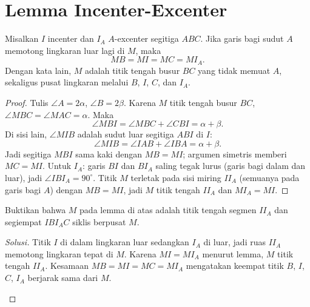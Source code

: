 \documentclass[12pt]{scrartcl}
\begin{document}
\section{Lemma Incenter-Excenter}

\begin{theorem}
Misalkan $I$ incenter dan $I_A$ $A$-excenter segitiga $ABC$.
Jika garis bagi sudut $A$ memotong lingkaran luar lagi di $M$, maka
\[ MB = MI = MC = MI_A. \]
Dengan kata lain, $M$ adalah titik tengah busur $BC$
yang tidak memuat $A$, sekaligus pusat lingkaran melalui
$B$, $I$, $C$, dan $I_A$.
\end{theorem}
\begin{proof}
Tulis $\angle A = 2\alpha$, $\angle B = 2\beta$.
Karena $M$ titik tengah busur $BC$,
$\angle MBC = \angle MAC = \alpha$. Maka
\[ \angle MBI = \angle MBC + \angle CBI = \alpha + \beta. \]
Di sisi lain, $\angle MIB$ adalah sudut luar segitiga $ABI$ di $I$:
\[ \angle MIB = \angle IAB + \angle IBA = \alpha + \beta. \]
Jadi segitiga $MBI$ sama kaki dengan $MB = MI$;
argumen simetris memberi $MC = MI$.
Untuk $I_A$: garis $BI$ dan $BI_A$ saling tegak lurus
(garis bagi dalam dan luar), jadi $\angle IBI_A = 90^\circ$.
Titik $M$ terletak pada sisi miring $II_A$ (semuanya pada garis bagi $A$)
dengan $MB = MI$, jadi $M$ titik tengah $II_A$ dan $MI_A = MI$.
\end{proof}

\begin{example}
Buktikan bahwa $M$ pada lemma di atas adalah titik tengah segmen $II_A$
dan segiempat $IBI_AC$ siklis berpusat $M$.
\end{example}
\begin{proof}[Solusi]
Titik $I$ di dalam lingkaran luar sedangkan $I_A$ di luar,
jadi ruas $II_A$ memotong lingkaran tepat di $M$.
Karena $MI = MI_A$ menurut lemma, $M$ titik tengah $II_A$.
Kesamaan $MB = MI = MC = MI_A$ mengatakan keempat titik
$B$, $I$, $C$, $I_A$ berjarak sama dari $M$.
\begin{center}
\end{center}
\end{proof}
\end{document}
